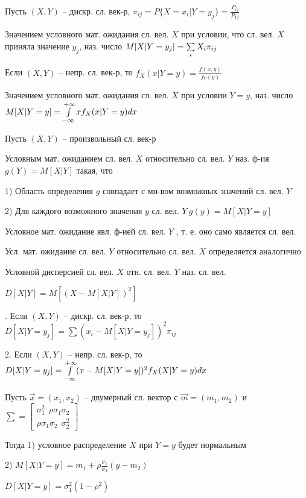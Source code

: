 
Пусть $(X,Y)$ -- дискр. сл. век-р, $\pi_{ij}=P\{X=x_i|Y=y_j\}=\tfrac{P_{ij}}{P_{Yj}}$

\OPR Значением условного мат. ожидания сл. вел. $X$ при условии, что сл. вел. $X$ приняла значение $y_j$, наз. число $M[X|Y=y_j]=\sum\limits_{i}X_i\pi_{ij}$

Если $(X,Y)$ -- непр. сл. век-р, то $f_X(x|Y=y)=\tfrac{f(x,y)}{f_Y(y)}$

\OPR Значением условного мат. ожидания сл. вел. $X$ при условии $Y=y$, наз. число $M[X|Y=y]=\int\limits_{-\infty}^{+\infty}xf_X(x|Y=y)dx$

Пусть $(X,Y)$ -- произвольный сл. век-р

\OPR Условным мат. ожиданием сл. вел. $X$ относительно сл. вел. $Y$ наз. ф-ия $g(Y)=M[X|Y]$ такая, что 

1) Область определения $g$ совпадает с мн-вом возможных значений сл. вел. $Y$

2) Для каждого возможного значения $y$ сл. вел. $Y~g(y)=M[X|Y=y]$

\ZAM Условное мат. ожидание явл. ф-ией сл. вел. $Y$ , т. е. оно само является сл. вел.

\ZAM Усл. мат. ожидание сл. вел. $Y$ относительно сл. вел. $X$ определяется аналогично

\OPR Условной дисперсией сл. вел. $X$ отн. сл. вел. $Y$ наз. сл. вел. 

$D[X|Y]=M[(X-M[X|Y])^2]$

. Если $(X,Y)$ -- дискр. сл. век-р, то $D[X|Y=y_j]=\sum(x_i-M[X|Y=y_j])^2\pi_{ij}$

2. Если $(X,Y)$ -- непр. сл. век-р, то $D[X|Y=y_j]=\int\limits_{-\infty}^{+\infty}(x-M[X|Y=y])^2f_X(X|Y=y)dx$

Пусть $\overrightarrow{x}=(x_1,x_2)$ -- двумерный сл. вектор с $\overrightarrow{m}=(m_1,m_2)$ и $\sum = 
\left[\begin{array}{l}
	\sigma_1^2 ~~\rho\sigma_1\sigma_2 \\
	\rho\sigma_1\sigma_2 ~~\sigma_2^2
\end{array}\right]$

Тогда 1) условное распределение $X$ при $Y=y$ будет нормальным

2) $M[X|Y=y]=m_1+\rho\tfrac{\sigma_1}{\sigma_2}(y-m_2)$

$D[X|Y=y]=\sigma_1^2(1-\rho^2)$

\clearpage

